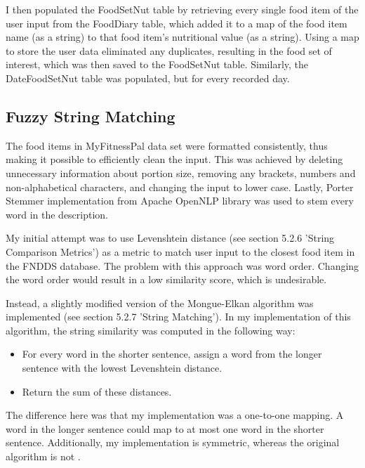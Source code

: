 \documentclass{article}
\begin{document}
\bigskip
\noindent I then populated the FoodSetNut table by retrieving every single food item of the user input from the FoodDiary table, which added it to a map of the food item name (as a string) to that food item's nutritional value (as a string). Using a map to store the user data eliminated any duplicates, resulting in the food set of interest, which was then saved to the FoodSetNut table. Similarly, the DateFoodSetNut table was populated, but for every recorded day.

\subsection{Fuzzy String Matching}
The food items in MyFitnessPal data set \cite{diet_success_predictions} were formatted consistently, thus making it possible to efficiently clean the input. This was achieved by deleting unnecessary information about portion size, removing any brackets, numbers and non-alphabetical characters, and changing the input to lower case. Lastly, Porter Stemmer implementation from Apache OpenNLP library \cite{apache_opennlp} was used to stem every word in the description. 

\bigskip
\noindent My initial attempt was to use Levenshtein distance (see section 5.2.6 'String Comparison Metrics') as a metric to match user input to the closest food item in the FNDDS database. The problem with this approach was word order. Changing the word order would result in a low similarity score, which is undesirable.

\bigskip
\noindent Instead, a slightly modified version of the Mongue-Elkan algorithm was implemented (see section 5.2.7 'String Matching'). In my implementation of this algorithm, the string similarity was computed in the following way: 

\begin{itemize}
    \item For every word in the shorter sentence, assign a word from the longer sentence with the lowest Levenshtein distance. 
    \item Return the sum of these distances. 
\end{itemize}

\bigskip
\noindent The difference here was that my implementation was a one-to-one mapping. A word in the longer sentence could map to at most one word in the shorter sentence. Additionally, my implementation is symmetric, whereas the original algorithm is not \cite{mongue_elkan}. 
\end{document}
